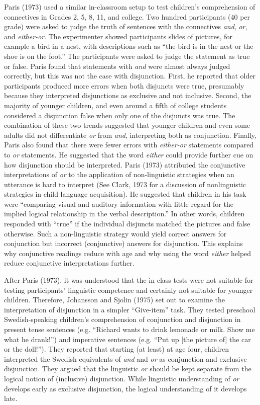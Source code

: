 \documentclass[floatsintext,man]{apa6}
\theoremstyle{definition}
\theoremstyle{definition}
\theoremstyle{definition}
\theoremstyle{remark}
\begin{document}
Paris (1973) used a similar in-classroom setup to test children's
comprehension of connectives in Grades 2, 5, 8, 11, and college. Two
hundred participants (40 per grade) were asked to judge the truth of
sentences with the connectives \emph{and}, \emph{or}, and
\emph{either-or}. The experimenter showed participants slides of
pictures, for example a bird in a nest, with descriptions such as
\enquote{the bird is in the nest or the shoe is on the foot.} The
participants were asked to judge the statement as true or false. Paris
found that statements with \emph{and} were almost always judged
correctly, but this was not the case with disjunction. First, he
reported that older participants produced more errors when both
disjuncts were true, presumably because they interpreted disjunctions as
exclusive and not inclusive. Second, the majority of younger children,
and even around a fifth of college students considered a disjunction
false when only one of the disjuncts was true. The combination of these
two trends suggested that younger children and even some adults did not
differentiate \emph{or} from \emph{and}, interpreting both as
conjunction. Finally, Paris also found that there were fewer errors with
\emph{either-or} statements compared to \emph{or} statements. He
suggested that the word \emph{either} could provide further cue on how
disjunction should be interpreted. Paris (1973) attributed the
conjunctive interpretations of \emph{or} to the application of
non-linguistic strategies when an utterance is hard to interpret (See
Clark, 1973 for a discussion of nonlinguistic strategies in child
language acquisition). He suggested that children in his task were
\enquote{comparing visual and auditory information with little regard
for the implied logical relationship in the verbal description.} In
other words, children responded with \enquote{true} if the individual
disjuncts matched the pictures and false otherwise. Such a
non-linguistic strategy would yield correct answers for conjunction but
incorrect (conjunctive) answers for disjunction. This explains why
conjunctive readings reduce with age and why using the word
\emph{either} helped reduce conjunctive interpretations further.

After Paris (1973), it was understood that the in-class tests were not
suitable for testing participants' linguistic competence and certainly
not suitable for younger children. Therefore, Johansson and Sjolin
(1975) set out to examine the interpretation of disjunction in a simpler
\enquote{Give-item} task. They tested preschool Swedish-speaking
children's comprehension of conjunction and disjunction in present tense
sentences (e.g. \enquote{Richard wants to drink lemonade or milk. Show
me what he drank!}) and imperative sentences (e.g. \enquote{Put up
{[}the picture of{]} the car or the doll!}). They reported that starting
(at least) at age four, children interpreted the Swedish equivalents of
\emph{and} and \emph{or} as conjunction and exclusive disjunction. They
argued that the linguistic \emph{or} should be kept separate from the
logical notion of (inclusive) disjunction. While linguistic
understanding of \emph{or} develops early as exclusive disjunction, the
logical understanding of it develops late.
\end{document}
